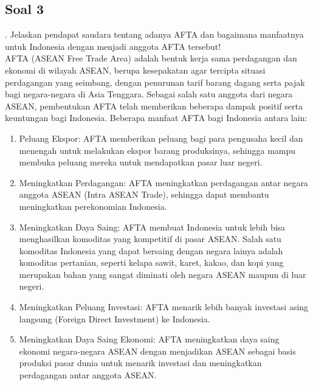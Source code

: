 \documentclass[12pt]{article}
\begin{document}
\subsection*{Soal 3}
. Jelaskan pendapat saudara tentang adanya AFTA dan bagaimana manfaatnya untuk Indonesia dengan menjadi anggota AFTA tersebut!\\

AFTA (ASEAN Free Trade Area) adalah bentuk kerja sama perdagangan dan ekonomi di wilayah ASEAN, berupa kesepakatan agar tercipta situasi perdagangan yang seimbang, dengan penurunan tarif barang dagang serta pajak bagi negara-negara di Asia Tenggara. Sebagai salah satu anggota dari negara ASEAN, pembentukan AFTA telah memberikan beberapa dampak positif serta keuntungan bagi Indonesia\autocite{qothru2021}. Beberapa manfaat AFTA bagi Indonesia antara lain:
\begin{enumerate}
    
\item Peluang Ekspor: AFTA memberikan peluang bagi para pengusaha kecil dan menengah untuk melakukan ekspor barang produksinya, sehingga mampu membuka peluang mereka untuk mendapatkan pasar luar negeri\autocite{tysara2022}.
    
\item Meningkatkan Perdagangan: AFTA meningkatkan perdagangan antar negara anggota ASEAN (Intra ASEAN Trade), sehingga dapat membantu meningkatkan perekonomian Indonesia\autocite{tysara2022}.

\item Meningkatkan Daya Saing: AFTA membuat Indonesia untuk lebih bisa menghasilkan komoditas yang kompetitif di pasar ASEAN. Salah satu komoditas Indonesia yang dapat bersaing dengan negara lainya adalah komoditas pertanian, seperti kelapa sawit, karet, kakao, dan kopi yang merupakan bahan yang sangat diminati oleh negara ASEAN maupun di luar negeri\autocite{tysara2022}.

\item Meningkatkan Peluang Investasi: AFTA menarik lebih banyak investasi asing langsung (Foreign Direct Investment) ke Indonesia\autocite{Putri2022AnalisisKA}.

\item Meningkatkan Daya Saing Ekonomi: AFTA meningkatkan daya saing ekonomi negara-negara ASEAN dengan menjadikan ASEAN sebagai basis produksi pasar dunia untuk menarik investasi dan meningkatkan perdagangan antar anggota ASEAN\autocite{Hadi2016AnalisisKD}.
\end{enumerate}
\end{document}
